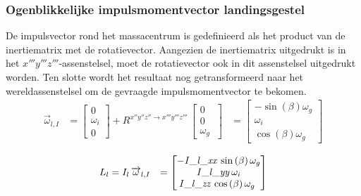\subsubsection{Ogenblikkelijke impulsmomentvector landingsgestel}
De impulsvector rond het massacentrum is gedefinieerd als het product van de inertiematrix met de rotatievector. Aangezien de inertiematrix uitgedrukt is in het $x'''y'''z'''$-assenstelsel, moet de rotatievector ook in dit assenstelsel uitgedrukt worden. 
Ten slotte wordt het resultaat nog getransformeerd naar het wereldassenstelsel om de gevraagde impulsmomentvector te bekomen.
\begin{equation*}
\begin{split}
\overrightarrow{\omega}_{l,I}
&=\begin{bmatrix}
0\\
\omega_{i}\\
0\
\end{bmatrix}
+R^{x''y''z'' \rightarrow x'''y'''z'''}\,
\begin{bmatrix}
0\\
0\\
\omega_{g}\
\end{bmatrix}
&=\begin{bmatrix}
-\sin \left( \beta \right) \omega_{g}
\\
\omega_{i}\\
\cos \left( \beta
 \right) \omega_{g}\
\end{bmatrix}
\end{split}
\end{equation*}

\begin{equation}
\begin{split}
L_{l}&=I_{l}\,\overrightarrow{\omega}_{l,I}&=
\begin{bmatrix}
-{\it I\_l\_xx}\,\sin \left( \beta \right) 
\omega_{g}\\
{\it I\_l\_yy}\,\omega_{i}
\\
{\it I\_l\_zz}\,\cos \left( \beta \right) \omega_
{g}\
\end{bmatrix}
\end{split}
\end{equation}


